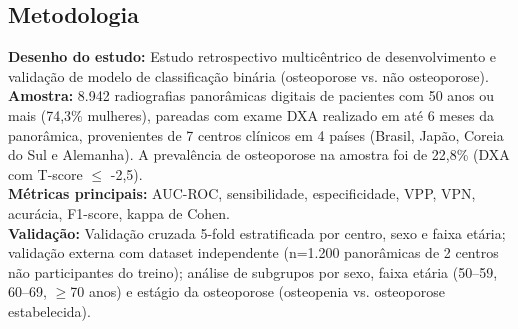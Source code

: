 \subsection{Metodologia}
\textbf{Desenho do estudo:} Estudo retrospectivo multicêntrico de
desenvolvimento e validação de modelo de classificação binária
(osteoporose vs. não osteoporose). \\
\textbf{Amostra:} 8.942 radiografias panorâmicas digitais de pacientes
com 50 anos ou mais (74,3\% mulheres), pareadas com exame DXA realizado
em até 6 meses da panorâmica, provenientes de 7 centros clínicos em 4
países (Brasil, Japão, Coreia do Sul e Alemanha). A prevalência de
osteoporose na amostra foi de 22,8\% (DXA com T-score $\leq$ -2,5). \\
\textbf{Métricas principais:} AUC-ROC, sensibilidade, especificidade,
VPP, VPN, acurácia, F1-score, kappa de Cohen. \\
\textbf{Validação:} Validação cruzada 5-fold estratificada por centro,
sexo e faixa etária; validação externa com dataset independente
(n=1.200 panorâmicas de 2 centros não participantes do treino);
análise de subgrupos por sexo, faixa etária (50--59, 60--69, $\geq$70
anos) e estágio da osteoporose (osteopenia vs. osteoporose
estabelecida).

